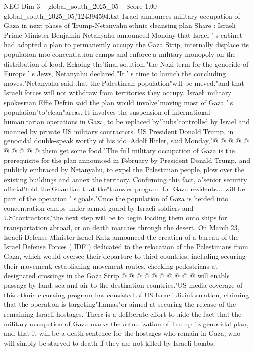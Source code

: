 \begin{textsample}{NEG Dim 3 – global\_south\_2025\_05 – Score 1.00 – global\_south\_2025\_05/124394594.txt}  \label{ex:f3_neg_230}
Israel announces military occupation of Gaza in next phase of Trump-Netanyahu ethnic cleansing plan Share : Israeli Prime Minister Benjamin Netanyahu announced Monday that Israel ' s cabinet had adopted a plan to permanently occupy the Gaza Strip, internally displace its population into concentration camps and enforce a military monopoly on the distribution of food.
Echoing the"final solution,"the Nazi term for the genocide of Europe ' s Jews, Netanyahu declared,"It ' s time to launch the concluding moves."Netanyahu said that the Palestinian population"will be moved,"and that Israeli forces will not withdraw from territories they occupy.
Israeli military spokesman Effie Defrin said the plan would involve"moving most of Gaza ' s population"to"clean"areas.
It involves the suspension of international humanitarian operations in Gaza, to be replaced by"hubs"controlled by Israel and manned by private US military contractors.
US President Donald Trump, in genocidal double-speak worthy of his idol Adolf Hitler, said Monday,"@ @ @ @ @ @ @ @ @ @ them get some food."The full military occupation of Gaza is the prerequisite for the plan announced in February by President Donald Trump, and publicly embraced by Netanyahu, to expel the Palestinian people, plow over the existing buildings and annex the territory.
Confirming this fact, a"senior security official"told the Guardian that the"transfer program for Gaza residents... will be part of the operation ' s goals."Once the population of Gaza is herded into concentration camps under armed guard by Israeli soldiers and US"contractors,"the next step will be to begin loading them onto ships for transportation abroad, or on death marches through the desert.
On March 23, Israeli Defense Minister Israel Katz announced the creation of a bureau of the Israel Defense Forces ( IDF ) dedicated to the relocation of the Palestinians from Gaza, which would oversee their"departure to third countries, including securing their movement, establishing movement routes, checking pedestrians at designated crossings in the Gaza Strip @ @ @ @ @ @ @ @ @ @ will enable passage by land, sea and air to the destination countries."US media coverage of this ethnic cleansing program has consisted of US-Israeli disinformation, claiming that the operation is targeting"Hamas"or aimed at securing the release of the remaining Israeli hostages.
There is a deliberate effort to hide the fact that the military occupation of Gaza marks the actualization of Trump ' s genocidal plan, and that it will be a death sentence for the hostages who remain in Gaza, who will simply be starved to death if they are not killed by Israeli bombs.

\end{textsample}
